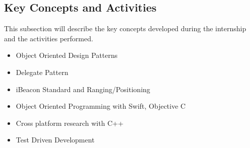 \subsection{Key Concepts and Activities}
This subsection will describe the key concepts developed during the internship and the activities performed.

\begin{itemize}
	\item Object Oriented Design Patterns
	\item Delegate Pattern
	\item iBeacon Standard and Ranging/Positioning
	\item Object Oriented Programming with Swift, Objective C
	\item Cross platform research with C++ 
	\item Test Driven Development
\end{itemize}

